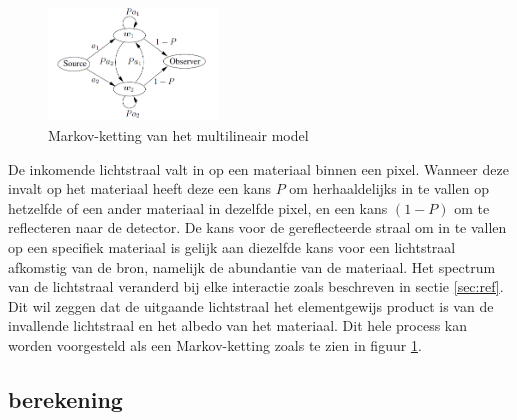 \documentclass[12pt]{report}
\begin{document}
\begin{figure}
\includegraphics[width=0.4\textwidth]{multi.PNG}
\caption{Markov-ketting van het multilineair model \label{fig:multi}}
\end{figure}

De inkomende lichtstraal valt in op een materiaal binnen een pixel. Wanneer deze invalt op het materiaal heeft deze een kans $P$ om herhaaldelijks in te vallen op hetzelfde of een ander materiaal in dezelfde pixel, en een kans $(1 - P)$ om te reflecteren naar de detector. De kans voor de gereflecteerde straal om in te vallen op een specifiek materiaal is gelijk aan diezelfde kans voor een lichtstraal afkomstig van de bron, namelijk de abundantie van de materiaal. Het spectrum van de lichtstraal veranderd bij elke interactie zoals beschreven in sectie \ref{sec:ref}. Dit wil zeggen dat de uitgaande lichtstraal  het elementgewijs product is van de invallende lichtstraal en het albedo van het materiaal.
Dit hele process kan worden voorgesteld als een Markov-ketting zoals te zien in figuur \ref{fig:multi}.






\subsection{berekening}
\end{document}
